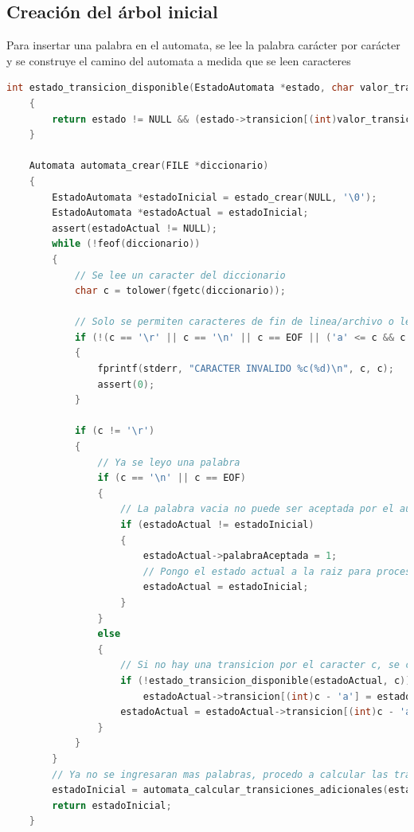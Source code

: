 \documentclass{article}
\begin{document}
\subsection*{Creación del árbol inicial}

Para insertar una palabra en el automata, se lee la palabra carácter por carácter y se construye el camino
del automata a medida que se leen caracteres

\begin{lstlisting}[language=C]
    int estado_transicion_disponible(EstadoAutomata *estado, char valor_transicion)
    {
        return estado != NULL && (estado->transicion[(int)valor_transicion - 'a']) != NULL;
    }

    Automata automata_crear(FILE *diccionario)
    {
        EstadoAutomata *estadoInicial = estado_crear(NULL, '\0');
        EstadoAutomata *estadoActual = estadoInicial;
        assert(estadoActual != NULL);
        while (!feof(diccionario))
        {
            // Se lee un caracter del diccionario
            char c = tolower(fgetc(diccionario));

            // Solo se permiten caracteres de fin de linea/archivo o letras del abecedario
            if (!(c == '\r' || c == '\n' || c == EOF || ('a' <= c && c <= 'z')))
            {
                fprintf(stderr, "CARACTER INVALIDO %c(%d)\n", c, c);
                assert(0);
            }

            if (c != '\r')
            {
                // Ya se leyo una palabra
                if (c == '\n' || c == EOF)
                {
                    // La palabra vacia no puede ser aceptada por el automata, asi que si se ingreso una linea vacia esta se saltea, de lo contrario el estado actual es un estado de aceptacion
                    if (estadoActual != estadoInicial)
                    {
                        estadoActual->palabraAceptada = 1;
                        // Pongo el estado actual a la raiz para procesar otra palabra
                        estadoActual = estadoInicial;
                    }
                }
                else
                {
                    // Si no hay una transicion por el caracter c, se crea un estado para esta transicion y se conectan el estado actual y el nuevo estado por el caracter c
                    if (!estado_transicion_disponible(estadoActual, c))
                        estadoActual->transicion[(int)c - 'a'] = estado_crear(estadoActual, c);
                    estadoActual = estadoActual->transicion[(int)c - 'a'];
                }
            }
        }
        // Ya no se ingresaran mas palabras, procedo a calcular las transiciones de falla y salida
        estadoInicial = automata_calcular_transiciones_adicionales(estadoInicial);
        return estadoInicial;
    }
\end{lstlisting}
\end{document}
